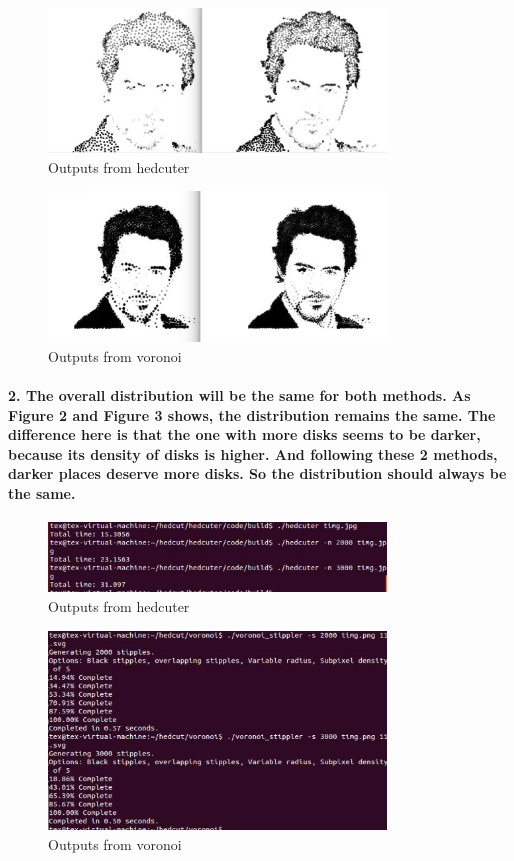 \documentclass[11pt]{article}
\begin{document}
\begin{figure}[h!]
\centering
\includegraphics[width=0.80\textwidth]{figure2.eps}
\caption{Outputs from hedcuter}
\label{threadsVsSync}
\end{figure}
\begin{figure}[h!]
\centering
\includegraphics[width=0.80\textwidth]{figure3.eps}
\caption{Outputs from voronoi}
\label{threadsVsSync}
\end{figure}
\paragraph{2. The overall distribution will be the same for both methods. As Figure 2 and Figure 3 shows, the distribution remains the same. The difference here is that the one with more disks seems to be darker, because its density of disks is higher. And following these 2 methods, darker places deserve more disks. So the distribution should always be the same.}

\begin{figure}[h!]
\centering
\includegraphics[width=0.80\textwidth]{figure4.eps}
\caption{Outputs from hedcuter}
\label{threadsVsSync}
\end{figure}
\begin{figure}[h!]
\centering
\includegraphics[width=0.80\textwidth]{figure5.eps}
\caption{Outputs from voronoi}
\label{threadsVsSync}
\end{figure}
\end{document}

